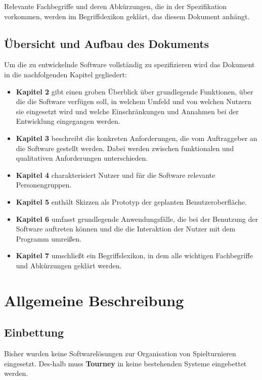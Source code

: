 \documentclass[11pt]{article}
\begin{document}
Relevante Fachbegriffe und deren Abkürzungen, die in der Spezifikation vorkommen, werden im Begriffslexikon geklärt, das diesem Dokument anhängt.

\subsection{Übersicht und Aufbau des Dokuments}

Um die zu entwickelnde Software vollständig zu spezifizieren wird das Dokument in die nachfolgenden Kapitel gegliedert:
\begin{itemize}
	\item[] \textbf{Kapitel 2} gibt einen groben Überblick über grundlegende Funktionen, über die die Software verfügen soll, in welchem Umfeld und von welchen Nutzern sie eingesetzt wird und welche Einschränkungen und Annahmen bei der Entwicklung eingegangen werden.
	\item[] \textbf{Kapitel 3} beschreibt die konkreten Anforderungen, die vom Auftraggeber an die Software gestellt werden. Dabei werden zwischen funktionalen und qualitativen Anforderungen unterschieden.
	\item[] \textbf{Kapitel 4} charakterisiert Nutzer und für die Software relevante Personengruppen.
	\item[] \textbf{Kapitel 5} enthält Skizzen als Prototyp der geplanten Benutzeroberfläche.
	\item[] \textbf{Kapitel 6} umfasst grundlegende Anwendungsfälle, die bei der Benutzung der Software auftreten können und die die Interaktion der Nutzer mit dem Programm umreißen.
	\item[] \textbf{Kapitel 7} umschließt ein Begriffslexikon, in dem alle wichtigen Fachbegriffe und Abkürzungen geklärt werden.
\end{itemize}

\newpage

\section{Allgemeine Beschreibung}

\subsection{Einbettung}

Bisher wurden keine Softwarelösungen zur Organisation von Spielturnieren eingesetzt. Des-halb muss \textbf{Tourney} in keine bestehenden Systeme eingebettet werden.
\end{document}
